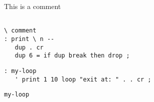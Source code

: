 \documentclass{article}
\begin{document}
 
This is a comment
\begin{verbatim}

\ comment 
: print \ n --
   dup . cr 
   dup 6 = if dup break then drop ;
\end{verbatim} 
   \begin{verbatim}
: my-loop
   ' print 1 10 loop "exit at: " . . cr ;
\end{verbatim} 
   \begin{verbatim}
my-loop

\end{verbatim} 
\end{document}

